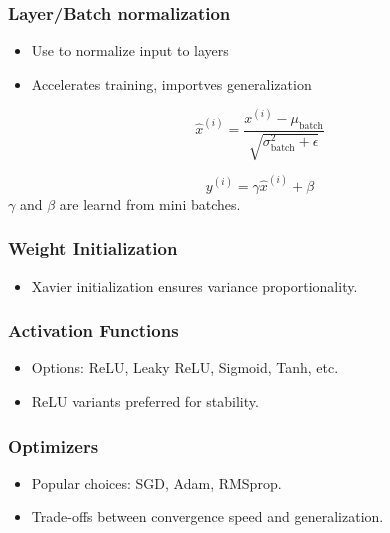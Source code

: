 \subsubsection{Layer/Batch normalization}
\begin{itemize}
    \item Use to normalize input to layers
    \item Accelerates training, importves generalization
\end{itemize}
\begin{equation*}
    \hat{x}^{(i)} = \frac{x^{(i)} - \mu_{\text{batch}}}{\sqrt{\sigma^2_{\text{batch}} + \epsilon}}
\end{equation*}
    
\begin{equation*}
    y^{(i)} = \gamma \hat{x}^{(i)} + \beta
\end{equation*}
\(\gamma\) and \(\beta\) are learnd from mini batches.

\subsubsection{Weight Initialization}
\begin{itemize}
    \item Xavier initialization ensures variance proportionality.
\end{itemize}

\subsubsection{Activation Functions}
\begin{itemize}
    \item Options: ReLU, Leaky ReLU, Sigmoid, Tanh, etc.
    \item ReLU variants preferred for stability.
\end{itemize}

\subsubsection{Optimizers}
\begin{itemize}
    \item Popular choices: SGD, Adam, RMSprop.
    \item Trade-offs between convergence speed and generalization.
\end{itemize}

